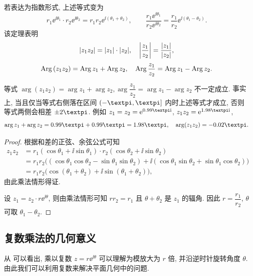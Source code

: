 若表达为指数形式, 上述等式变为
  \[
    r_1\ee^{\ii\theta_1}\cdot r_2\ee^{\ii\theta_2}=r_1r_2\ee^{\ii(\theta_1+\theta_2)},\qquad
    \frac{r_1\ee^{\ii\theta_1}}{r_2\ee^{\ii\theta_2}}=\frac{r_1}{r_2}\ee^{\ii(\theta_1-\theta_2)}.
  \]
该定理表明
\[
  \lvert z_1z_2\rvert=\lvert z_1\rvert\cdot\lvert z_2\rvert,\quad
  \biggl\vert\frac{z_1}{z_2}\biggr\vert=\frac{\lvert z_1\rvert}{\lvert z_2\rvert},
\]
\begin{equation}
  \label{eq:Arg-multiply-divide-equality}
  \operatorname{Arg}{(z_1z_2)}=\operatorname{Arg} z_1+\operatorname{Arg} z_2,\quad
  \operatorname{Arg}{\frac{z_1}{z_2}}=\operatorname{Arg} z_1-\operatorname{Arg} z_2.
\end{equation}

  \alert{等式 $\arg{(z_1z_2)}=\arg z_1+\arg z_2, \arg{\dfrac{z_1}{z_2}}=\arg z_1-\arg z_2$ 不一定成立.} \smallskip
事实上, 当且仅当等式右侧落在区间 $(-\cpi,\cpi]$ 内时上述等式才成立, 否则等式两侧会相差 $\pm2\cpi$.
例如 $z_1=z_2=\ee^{0.99\cpi \ii}$, $z_1z_2=\ee^{1.98\cpi \ii}$,
\[
  \arg z_1+\arg z_2=0.99\cpi+0.99\cpi=1.98\cpi,\quad
  \arg(z_1z_2)=-0.02\cpi.
\]

\begin{proof}
  根据和差的正弦、余弦公式可知
  \begin{align*}
     z_1z_2&
    =r_1(\cos\theta_1+\ii\sin\theta_1)\cdot
     r_2(\cos\theta_2+\ii\sin\theta_2)\\&
    =r_1r_2\bigl(
       (\cos\theta_1\cos\theta_2-\sin\theta_1\sin\theta_2)
    +\ii(\cos\theta_1\sin\theta_2+\sin\theta_1\cos\theta_2)
     \bigr)\\&
    =r_1r_2\bigl(
      \cos(\theta_1+\theta_2)+\ii\sin(\theta_1+\theta_2)
     \bigr),
  \end{align*}
  由此乘法情形得证.

  设 $z_1=z_2\cdot r\ee^{\ii\theta}$, 则由乘法情形可知 $rr_2=r_1$ 且 $\theta+\theta_2$ 是 $z_1$ 的辐角.
  因此 $r=\dfrac{r_1}{r_2}$, $\theta$ 可取 $\theta_1-\theta_2$.
\end{proof}


\subsection{复数乘法的几何意义}

从 可以看出, 乘以复数 $z=r\ee^{\ii\theta}$ 可以理解为\alert{模放大为 $r$ 倍, 并沿逆时针旋转角度 $\theta$}.
由此我们可以利用复数来解决平面几何中的问题.

